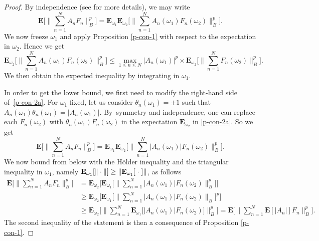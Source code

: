 \documentclass[10pt]{amsart}
\theoremstyle{theorem}
\theoremstyle{definition}
\newcommand\E{\mathbf{E}}
\begin{document}
\begin{proof}
By independence (see \cite[App.\,F]{imek-aif} for more details), we may write
\begin{equation}\label{p-con-2a}
\E\biggl[\Big\| \sum_{n=1}^N A_n F_n \Big\|_{B}^p \biggr]=
\E_{\omega_1} \E_{\omega_2}\biggl[\Big\| \sum_{n=1}^N A_n(\omega_1) F_n(\omega_2) \Big\|_{B}^p \biggr].
\end{equation}
We now freeze $\omega_1$ and apply Proposition \ref{p-con-1} with respect to the expectation in $\omega_2$. Hence we get
\begin{equation*}
\E_{\omega_2}\biggl[\Big\| \sum_{n=1}^N A_n(\omega_1) F_n(\omega_2) \Big\|_{B}^p \biggr] \leq \max_{1\leq n\leq N} |A_n(\omega_1)|^p\times
\E_{\omega_2}\biggl[\Big\| \sum_{n=1}^N F_n(\omega_2) \Big\|_{B}^p \biggr].
\end{equation*}
We then obtain the expected inequality by integrating in $\omega_1$.

In order to get the lower bound, we first need to modify the right-hand side of~\eqref{p-con-2a}.
For $\omega_1$ fixed, let us consider $\theta_n(\omega_1)=\pm 1$ such that $A_n(\omega_1)\theta_n(\omega_1)=|A_n(\omega_1)|$.
By~\hbox{symmetry} and independence, one can replace each $F_n(\omega_2)$ with $\theta_n(\omega_1) F_n(\omega_2)$ in the expectation $\E_{\omega_2}$ in \eqref{p-con-2a}. So we get\vspace*{-3pt}
\begin{equation}\label{symsym}
\E\biggl[\Big\| \sum_{n=1}^N A_n F_n \Big\|_{B}^p \biggr]=
\E_{\omega_1} \E_{\omega_2}\biggl[\Big\| \sum_{n=1}^N |A_n(\omega_1)| F_n(\omega_2) \Big\|_{B}^p \biggr].
\end{equation}
We now bound from below with the Hölder inequality and the triangular inequality in $\omega_1$, namely $\E_{\omega_1}[\|\cdot\|]\geq \|\E_{\omega_1}[\hspace{1 mm}\cdot\hspace{1 mm}]\|$, as follows\vspace*{-3pt}
\begin{align*}
\E\biggl[\Big\| \sum_{n=1}^N A_n F_n \Big\|_{B}^p \biggr]&=
\E_{\omega_2}\biggl[\E_{\omega_1}\biggl[\Big\| \sum_{n=1}^N |A_n(\omega_1)| F_n(\omega_2) \Big\|_{B}^p \biggr]\biggr]\\[-3pt]
&\geq \E_{\omega_2}\biggl[\E_{\omega_1}\biggl[\Big\|\sum_{n=1}^N |A_n(\omega_1)|F_n(\omega_2) \Big\|_B \biggr]^p \biggr]\\[-3pt]
&\geq \E_{\omega_2}\biggl[\Big\|\sum_{n=1}^N \E_{\omega_1}\big[|A_n(\omega_1)|F_n(\omega_2) \big]\Big\|_B^p \biggr]=\E\biggl[\Big\|\sum_{n=1}^N \E[|A_n|]F_n \Big\|_B^p \biggr].
\end{align*}
The second inequality of the statement is then a consequence of Proposition \ref{p-con-1}.
\end{proof}
\end{document}
